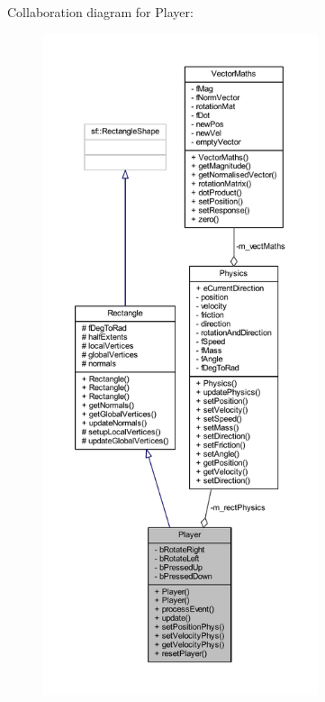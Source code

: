 Collaboration diagram for Player\+:\nopagebreak
\begin{figure}[H]
\begin{center}
\leavevmode
\includegraphics[height=550pt]{class_player__coll__graph}
\end{center}
\end{figure}
